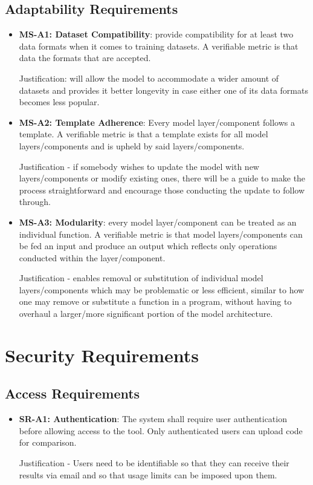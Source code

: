 \documentclass[12pt]{article}
\begin{document}
\subsection{Adaptability Requirements}
\begin{itemize}
    \item \textbf{MS-A1: Dataset Compatibility}: provide compatibility for at least 
    two data formats when it comes to training datasets. A verifiable metric is that data 
    the formats that are accepted.

    Justification: will allow the model to accommodate a wider amount of datasets 
    and provides it better longevity in case either one of its data formats 
    becomes less popular.
    
    \item \textbf{MS-A2: Template Adherence}: Every model layer/component follows a 
    template. A verifiable metric is that a template exists for all model layers/components and
     is upheld by said layers/components.

    Justification - if somebody wishes to update the model with new 
    layers/components or modify existing ones, there will be a guide to make 
    the process straightforward and encourage those conducting the update to 
    follow through.

    \item \textbf{MS-A3: Modularity}:  every model layer/component can be treated as 
    an individual function. A verifiable metric is that model layers/components can be fed an 
    input and produce an output which reflects only operations conducted within
     the layer/component.

    Justification - enables removal or substitution of individual model 
    layers/components which may be problematic or less efficient, similar to 
    how one may remove or substitute a function in a program, without having to
     overhaul a larger/more significant portion of the model architecture.


\end{itemize}

\section{Security Requirements}
\subsection{Access Requirements}
\begin{itemize}
    \item \textbf{SR-A1: Authentication}: The system shall require user authentication
    before allowing access to the tool. Only authenticated users can upload code for comparison.

    Justification - Users need to be identifiable so that they can receive their results via email and so that usage limits can be imposed upon them.
\end{itemize}
\end{document}
